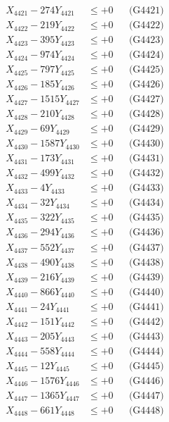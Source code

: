 \documentclass[a4paper,10pt]{article}
\begin{document}
{\begin{align}
\allowbreak
X_{4421} - 274Y_{4421} &\leq +0 && \text{(G4421)} \\
X_{4422} - 219Y_{4422} &\leq +0 && \text{(G4422)} \\
X_{4423} - 395Y_{4423} &\leq +0 && \text{(G4423)} \\
X_{4424} - 974Y_{4424} &\leq +0 && \text{(G4424)} \\
X_{4425} - 797Y_{4425} &\leq +0 && \text{(G4425)} \\
X_{4426} - 185Y_{4426} &\leq +0 && \text{(G4426)} \\
X_{4427} - 1515Y_{4427} &\leq +0 && \text{(G4427)} \\
X_{4428} - 210Y_{4428} &\leq +0 && \text{(G4428)} \\
X_{4429} - 69Y_{4429} &\leq +0 && \text{(G4429)} \\
X_{4430} - 1587Y_{4430} &\leq +0 && \text{(G4430)} \\
\allowbreak
X_{4431} - 173Y_{4431} &\leq +0 && \text{(G4431)} \\
X_{4432} - 499Y_{4432} &\leq +0 && \text{(G4432)} \\
X_{4433} - 4Y_{4433} &\leq +0 && \text{(G4433)} \\
X_{4434} - 32Y_{4434} &\leq +0 && \text{(G4434)} \\
X_{4435} - 322Y_{4435} &\leq +0 && \text{(G4435)} \\
X_{4436} - 294Y_{4436} &\leq +0 && \text{(G4436)} \\
X_{4437} - 552Y_{4437} &\leq +0 && \text{(G4437)} \\
X_{4438} - 490Y_{4438} &\leq +0 && \text{(G4438)} \\
X_{4439} - 216Y_{4439} &\leq +0 && \text{(G4439)} \\
X_{4440} - 866Y_{4440} &\leq +0 && \text{(G4440)} \\
\allowbreak
X_{4441} - 24Y_{4441} &\leq +0 && \text{(G4441)} \\
X_{4442} - 151Y_{4442} &\leq +0 && \text{(G4442)} \\
X_{4443} - 205Y_{4443} &\leq +0 && \text{(G4443)} \\
X_{4444} - 558Y_{4444} &\leq +0 && \text{(G4444)} \\
X_{4445} - 12Y_{4445} &\leq +0 && \text{(G4445)} \\
X_{4446} - 1576Y_{4446} &\leq +0 && \text{(G4446)} \\
X_{4447} - 1365Y_{4447} &\leq +0 && \text{(G4447)} \\
X_{4448} - 661Y_{4448} &\leq +0 && \text{(G4448)} \\

\end{align}}
\end{document}
